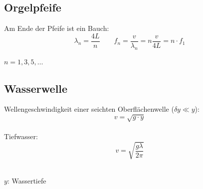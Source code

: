 \subsection{Orgelpfeife}
Am Ende der Pfeife ist ein Bauch:
\[
	\lambda_n = \frac{4L}{n} \qquad f_n = \frac{v}{\lambda_n} = n\frac{v}{4L} = n \cdot f_1
\]
\begin{footnotesize}
	$n=1,3,5,\ldots$
\end{footnotesize}


\subsection{Wasserwelle}
Wellengeschwindigkeit einer seichten Oberflächenwelle ($\delta y \ll y$):
\[\boxed{
	v = \sqrt{g \cdot y}
}\]
\\
Tiefwasser:
\[\boxed{
	v = \sqrt{\frac{g \lambda}{2 \pi}}
}\]
\\
\begin{footnotesize}
	$y$: Wassertiefe
\end{footnotesize}
